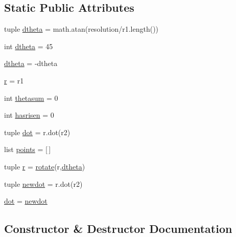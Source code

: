 \subsection*{Static Public Attributes}
\begin{DoxyCompactItemize}
\item 
tuple \hyperlink{classsegments_1_1_arc_a2f9627da9fc390ae13f127c8549623b9}{dtheta} = math.\+atan(resolution/r1.\+length())
\item 
int \hyperlink{classsegments_1_1_arc_a3e800fb7cf3ef773cd127da981876810}{dtheta} = 45
\item 
\hyperlink{classsegments_1_1_arc_a8e835a04e764d42e185f915fd9f3bce9}{dtheta} = -\/dtheta
\item 
\hyperlink{classsegments_1_1_arc_a84be00812b1c397042f5b8be5feec518}{r} = r1
\item 
int \hyperlink{classsegments_1_1_arc_a5f0e51ef80f616c6a5ccf07a29d6a1de}{thetasum} = 0
\item 
int \hyperlink{classsegments_1_1_arc_aa60754cac3ecc1d49bfcd049b32fb6c0}{hasrisen} = 0
\item 
tuple \hyperlink{classsegments_1_1_arc_a053bfc2466ef54bfb534c74ad4bb124b}{dot} = r.\+dot(r2)
\item 
list \hyperlink{classsegments_1_1_arc_a48fad9c6c73047f249693b5068c6c7a8}{points} = \mbox{[}$\,$\mbox{]}
\item 
tuple \hyperlink{classsegments_1_1_arc_a955e1e9545d5c812bc9aaa69527cd0c5}{r} = \hyperlink{namespacesegments_ae4847a0facad069d53643d562fac656b}{rotate}(r,\hyperlink{classsegments_1_1_arc_a2f9627da9fc390ae13f127c8549623b9}{dtheta})
\item 
tuple \hyperlink{classsegments_1_1_arc_ab3da41940de4a54ca10ad965fbb87460}{newdot} = r.\+dot(r2)
\item 
\hyperlink{classsegments_1_1_arc_a6aa2787698e6f943a74a65737d2ed36b}{dot} = \hyperlink{classsegments_1_1_arc_ab3da41940de4a54ca10ad965fbb87460}{newdot}
\end{DoxyCompactItemize}


\subsection{Constructor \& Destructor Documentation}
\hypertarget{classsegments_1_1_arc_a08eec2d7f6ed97eefcdc0d41152dc057}{}
